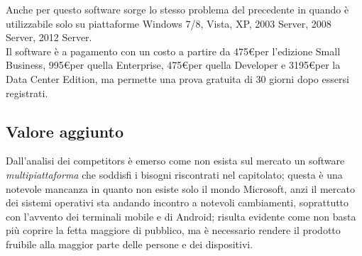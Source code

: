 Anche per questo software sorge lo stesso problema del precedente in quando è utilizzabile solo su piattaforme Windows 7/8, Vista, XP, 2003 Server, 2008 Server, 2012 Server.\\
Il software è a pagamento con un costo a partire da 475\euro per l'edizione Small Business, 995\euro per quella Enterprise, 475\euro per quella Developer e 3195\euro per la Data Center Edition, ma permette una prova gratuita di 30 giorni dopo essersi registrati.

\subsection{Valore aggiunto}
Dall'analisi dei competitors è emerso come non esista sul mercato un software \emph{multipiattaforma} che soddisfi i bisogni riscontrati nel capitolato; questa è una notevole mancanza in quanto non esiste solo il mondo Microsoft, anzi il mercato dei sistemi operativi sta andando incontro a notevoli cambiamenti, soprattutto con l'avvento dei terminali mobile e di Android; risulta evidente come non basta più coprire la fetta maggiore di pubblico, ma è necessario rendere il prodotto fruibile alla maggior parte delle persone e dei dispositivi.
